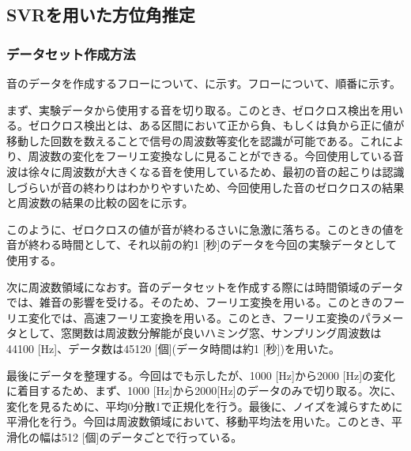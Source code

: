 \subsection{SVRを用いた方位角推定}
\label{sec:svr_method}

\subsubsection{データセット作成方法}
\label{sec:make_data_set}
音のデータを作成するフローについて、に示す。フローについて、順番に示す。

まず、実験データから使用する音を切り取る。このとき、ゼロクロス検出を用いる。ゼロクロス検出とは、ある区間において正から負、もしくは負から正に値が移動した回数を数えることで信号の周波数等変化を認識が可能である。これにより、周波数の変化をフーリエ変換なしに見ることができる。今回使用している音波は徐々に周波数が大きくなる音を使用しているため、最初の音の起こりは認識しづらいが音の終わりはわかりやすいため、今回使用した音のゼロクロスの結果と周波数の結果の比較の図をに示す。

このように、ゼロクロスの値が音が終わるさいに急激に落ちる。このときの値を音が終わる時間として、それ以前の約1 [秒]のデータを今回の実験データとして使用する。

次に周波数領域になおす。音のデータセットを作成する際には時間領域のデータでは、雑音の影響を受ける。そのため、フーリエ変換を用いる。このときのフーリエ変化では、高速フーリエ変換を用いる。このとき、フーリエ変換のパラメータとして、窓関数は周波数分解能が良いハミング窓、サンプリング周波数は44100 [Hz]、データ数は45120 [個](データ時間は約1 [秒])を用いた。

最後にデータを整理する。今回はでも示したが、1000 [Hz]から2000 [Hz]の変化に着目するため、まず、1000 [Hz]から2000[Hz]のデータのみで切り取る。次に、変化を見るために、平均0分散1で正規化を行う。最後に、ノイズを減らすために平滑化を行う。今回は周波数領域において、移動平均法を用いた。このとき、平滑化の幅は512 [個]のデータごとで行っている。

